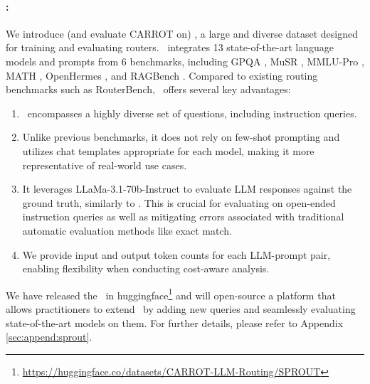 \paragraph{\newdata:} We introduce (and evaluate CARROT on) \newdata, a large and diverse dataset designed for training and evaluating routers. \newdata\ integrates 13 state-of-the-art language models and prompts from 6 benchmarks, including GPQA \citep{rein2023gpqagraduatelevelgoogleproofqa}, MuSR \citep{sprague2024musrtestinglimitschainofthought}, MMLU-Pro \citep{wang2024mmluprorobustchallengingmultitask}, MATH \citep{hendrycks2021measuringmathematicalproblemsolving}, OpenHermes \citep{teknium_openhermes_2.5}, and RAGBench \citep{friel2025ragbenchexplainablebenchmarkretrievalaugmented}. Compared to existing routing benchmarks such as RouterBench, \newdata\ offers several key advantages: 
\begin{enumerate}
    \item \newdata\ encompasses a highly diverse set of questions, including instruction queries.
    \item Unlike previous benchmarks, it does not rely on few-shot prompting and utilizes chat templates appropriate for each model, making it more representative of real-world use cases.
    \item It leverages LLaMa-3.1-70b-Instruct \citep{grattafiori2024llama3herdmodels} to evaluate LLM responses against the ground truth, similarly to \citet{ni2024mixeval}. This is crucial for evaluating on open-ended instruction queries as well as mitigating errors associated with traditional automatic evaluation methods like exact match.
    \item We provide input and output token counts for each LLM-prompt pair, enabling flexibility when conducting cost-aware analysis.
\end{enumerate}
We have released the \newdata\ in {huggingface}\footnote{\url{https://huggingface.co/datasets/CARROT-LLM-Routing/SPROUT}} and will open-source a platform that allows practitioners to extend \newdata\ by adding new queries and seamlessly evaluating state-of-the-art models on them. For further details, please refer to Appendix \ref{sec:append:sprout}.



